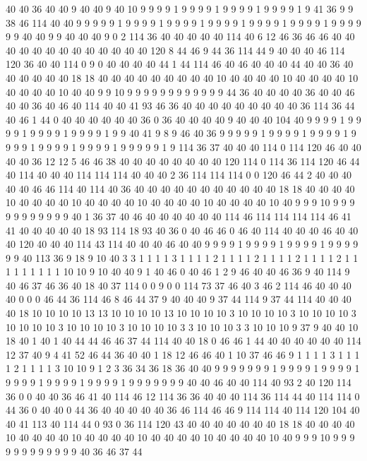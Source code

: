 40 40 36 40 40 9 40 40 9 40 10 9 9 9 9 1 9 9 9 9
1 9 9 9 9 1 9 9 9 9 1 9 41 36 9 9 38 46 114 40
40 9 9 9 9 9 1 9 9 9 9 1 9 9 9 9 1 9 9 9
9 1 9 9 9 9 1 9 9 9 9 1 9 9 9 9 9 9 40 40
9 9 40 40 40 9 0 2 114 36 40 40 40 40 40 114 40 6 12 46
36 46 46 40 40 40 40 40 40 40 40 40 40 40 40 40 120 8 44 46
9 44 36 114 44 9 40 40 40 46 114 120 36 40 40 114 0 9 0 40
40 40 40 44 1 44 114 46 40 46 40 40 40 44 40 40 36 40 40 40
40 40 40 18 18 40 40 40 40 40 40 40 40 40 10 40 40 40 40 10
40 40 40 40 10 40 40 40 40 10 40 40 9 9 10 9 9 9 9 9
9 9 9 9 9 9 9 44 36 40 40 40 40 36 40 40 46 40 40 36
40 46 40 114 40 40 41 93 46 36 40 40 40 40 40 40 40 40 40 36
114 36 44 40 46 1 44 0 40 40 40 40 40 40 36 0 36 40 40 40
40 9 40 40 40 104 40 9 9 9 9 1 9 9 9 9 1 9 9 9
9 1 9 9 9 9 1 9 9 40 41 9 8 9 46 40 36 9 9 9
9 9 1 9 9 9 9 1 9 9 9 9 1 9 9 9 9 1 9 9
9 9 1 9 9 9 9 1 9 9 9 9 9 1 9 114 36 37 40 40
40 114 0 114 120 46 40 40 40 40 36 12 12 5 46 46 38 40 40 40
40 40 40 40 40 120 114 0 114 36 114 120 46 44 40 114 40 40 40 114
114 114 40 40 40 2 36 114 114 114 0 0 120 46 44 2 40 40 40 40
40 46 46 114 40 114 40 36 40 40 40 40 40 40 40 40 40 40 40 18
18 40 40 40 40 10 40 40 40 40 10 40 40 40 40 10 40 40 40 40
10 40 40 40 40 10 40 9 9 9 10 9 9 9 9 9 9 9 9 9
9 9 40 1 36 37 40 46 40 40 40 40 40 40 114 46 114 114 114 114
46 41 41 40 40 40 40 40 18 93 114 18 93 40 36 0 40 46 46 0
46 40 114 40 40 40 46 40 40 40 120 40 40 40 114 43 114 40 40 40
46 40 40 9 9 9 9 1 9 9 9 9 1 9 9 9 9 1 9 9
9 9 9 9 40 113 36 9 18 9 10 40 3 3 1 1 1 1 3 1
1 1 1 2 1 1 1 1 2 1 1 1 1 2 1 1 1 1 2 1
1 1 1 1 1 1 1 1 10 10 9 10 40 40 9 1 40 46 0 40
46 1 2 9 46 40 40 46 36 9 40 114 9 40 46 37 46 36 40 18
40 37 114 0 0 9 0 0 114 73 37 46 40 3 46 2 114 46 40 40
40 40 0 0 0 46 44 36 114 46 8 46 44 37 9 40 40 40 9 37
44 114 9 37 44 114 40 40 40 40 18 10 10 10 10 13 13 10 10 10
10 13 10 10 10 10 3 10 10 10 10 3 10 10 10 10 3 10 10 10
10 3 10 10 10 10 3 10 10 10 10 3 3 10 10 10 3 3 10 10
10 9 37 9 40 40 10 18 40 1 40 1 40 44 44 46 46 37 44 114
40 40 18 0 46 46 1 44 40 40 40 40 40 40 114 12 37 40 9 4
41 52 46 44 36 40 40 1 18 12 46 46 40 1 10 37 46 46 9 1
1 1 1 3 1 1 1 1 2 1 1 1 1 3 10 10 9 1 2 3
36 34 36 18 36 40 40 9 9 9 9 9 9 9 1 9 9 9 9 1
9 9 9 9 1 9 9 9 9 1 9 9 9 9 1 9 9 9 9 1
9 9 9 9 9 9 9 40 40 46 40 40 114 40 93 2 40 120 114 36
0 0 40 40 36 46 41 40 114 46 12 114 36 36 40 40 40 114 36 114
44 40 114 114 0 44 36 0 40 40 0 44 36 40 40 40 40 40 36 46
114 46 46 9 114 114 40 114 120 104 40 40 41 113 40 114 44 0 93 0
36 114 120 43 40 40 40 40 40 40 40 18 18 40 40 40 40 10 40 40
40 40 10 40 40 40 40 10 40 40 40 40 10 40 40 40 40 10 40 9
9 9 10 9 9 9 9 9 9 9 9 9 9 9 9 40 36 46 37 44
